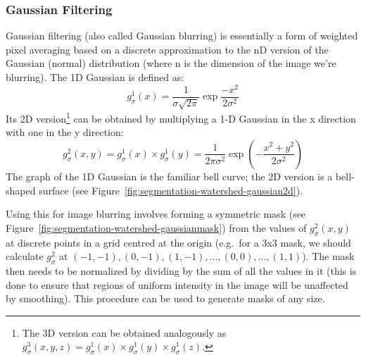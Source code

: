 \subsubsection{Gaussian Filtering}

Gaussian filtering (also called Gaussian blurring) is essentially a form of weighted pixel averaging based on a discrete approximation to the nD version of the Gaussian (normal) distribution (where n is the dimension of the image we're blurring). The 1D Gaussian is defined as:
%
\[
g_\sigma^1(x) = \frac{1}{\sigma\sqrt{2\pi}} \exp \frac{-x^2}{2\sigma^2}
\]
%
Its 2D version\footnote{The 3D version can be obtained analogously as $g_\sigma^3(x,y,z) = g_\sigma^1(x) \times g_\sigma^1(y) \times g_\sigma^1(z)$.} can be obtained by multiplying a 1-D Gaussian in the x direction with one in the y direction:
%
\[
g_\sigma^2(x,y) = g_\sigma^1(x) \times g_\sigma^1(y) = \frac{1}{2\pi\sigma^2} \exp \left( -\frac{x^2+y^2}{2\sigma^2} \right)
\]
%
The graph of the 1D Gaussian is the familiar bell curve; the 2D version is a bell-shaped surface (see Figure~\ref{fig:segmentation-watershed-gaussian2d}).


Using this for image blurring involves forming a symmetric mask (see Figure~\ref{fig:segmentation-watershed-gaussianmask}) from the values of $g_\sigma^2(x,y)$ at discrete points in a grid centred at the origin (e.g.~for a 3x3 mask, we should calculate $g_\sigma^2$ at $(-1,-1), (0,-1), (1,-1), \ldots, (0,0), \ldots, (1,1)$). The mask then needs to be normalized by dividing by the sum of all the values in it (this is done to ensure that regions of uniform intensity in the image will be unaffected by smoothing). This procedure can be used to generate masks of any size.

